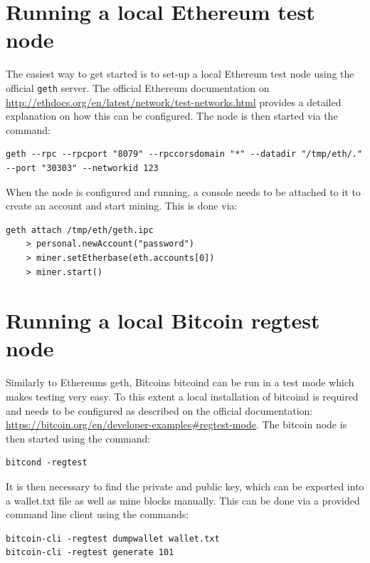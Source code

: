 \documentclass[12pt,msc,a4paper,oneside]{ucl_thesis}
\begin{document}
\section{Running a local Ethereum test node}
The easiest way to get started is to set-up a local Ethereum test node using the official \texttt{geth} server. The official Ethereum documentation on \url{http://ethdocs.org/en/latest/network/test-networks.html} provides a detailed explanation on how this can be configured. The node is then started via the command:
\begin{Code}
\begin{lstlisting}[style=myBash, caption=Starting Ethereum test node]
geth --rpc --rpcport "8079" --rpccorsdomain "*" --datadir "/tmp/eth/." --port "30303" --networkid 123
\end{lstlisting}
\end{Code}
\noindent When the node is configured and running, a console needs to be attached to it to create an account and start mining. This is done via:
\begin{Code}
\begin{lstlisting}[style=myBash, caption=Start Ethereum test node mining]
geth attach /tmp/eth/geth.ipc 
    > personal.newAccount("password")
    > miner.setEtherbase(eth.accounts[0])
    > miner.start()
\end{lstlisting}
\end{Code}

\section{Running a local Bitcoin regtest node}
Similarly to Ethereums geth, Bitcoins bitcoind can be run in a test mode which makes testing very easy. To this extent a local installation of bitcoind is required and needs to be configured as described on the official documentation: \url{https://bitcoin.org/en/developer-examples#regtest-mode}. The bitcoin node is then started using the command:
\begin{Code}
\begin{lstlisting}[style=myBash, caption=Starting Ethereum regtest node]
bitcond -regtest
\end{lstlisting}
\end{Code}
\noindent It is then necessary to find the private and public key, which can be exported into a wallet.txt file as well as mine blocks manually. This can be done via a provided command line client using the commands:
\begin{Code}
\begin{lstlisting}[style=myBash, caption=Start Bitcoin regtest mining]
bitcoin-cli -regtest dumpwallet wallet.txt
bitcoin-cli -regtest generate 101
\end{lstlisting}
\end{Code}
\end{document}
